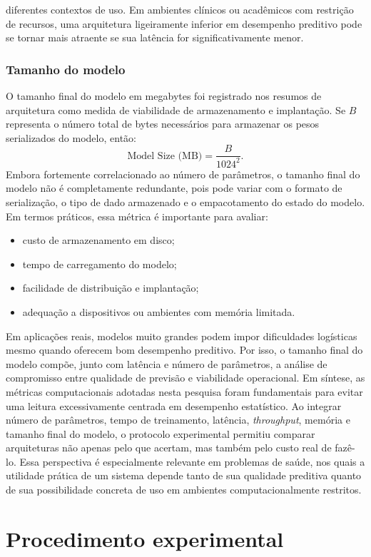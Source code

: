 \documentclass[tcc,capa]{texufpel}
\begin{document}
diferentes contextos de uso. Em ambientes clínicos ou acadêmicos com restrição de recursos, uma arquitetura ligeiramente inferior em desempenho preditivo pode se tornar mais atraente se sua latência for significativamente menor. \subsubsection{Tamanho do modelo} O tamanho final do modelo em megabytes foi registrado nos resumos de arquitetura como medida de viabilidade de armazenamento e implantação. Se \(B\) representa o número total de bytes necessários para armazenar os pesos serializados do modelo, então: \[ \text{Model Size (MB)} = \frac{B}{1024^2}. \] Embora fortemente correlacionado ao número de parâmetros, o tamanho final do modelo não é completamente redundante, pois pode variar com o formato de serialização, o tipo de dado armazenado e o empacotamento do estado do modelo. Em termos práticos, essa métrica é importante para avaliar: \begin{itemize} \item custo de armazenamento em disco; \item tempo de carregamento do modelo; \item facilidade de distribuição e implantação; \item adequação a dispositivos ou ambientes com memória limitada. \end{itemize} Em aplicações reais, modelos muito grandes podem impor dificuldades logísticas mesmo quando oferecem bom desempenho preditivo. Por isso, o tamanho final do modelo compõe, junto com latência e número de parâmetros, a análise de compromisso entre qualidade de previsão e viabilidade operacional. Em síntese, as métricas computacionais adotadas nesta pesquisa foram fundamentais para evitar uma leitura excessivamente centrada em desempenho estatístico. Ao integrar número de parâmetros, tempo de treinamento, latência, \textit{throughput}, memória e tamanho final do modelo, o protocolo experimental permitiu comparar arquiteturas não apenas pelo que acertam, mas também pelo custo real de fazê-lo. Essa perspectiva é especialmente relevante em problemas de saúde, nos quais a utilidade prática de um sistema depende tanto de sua qualidade preditiva quanto de sua possibilidade concreta de uso em ambientes computacionalmente restritos.

\section{Procedimento experimental}
\end{document}
